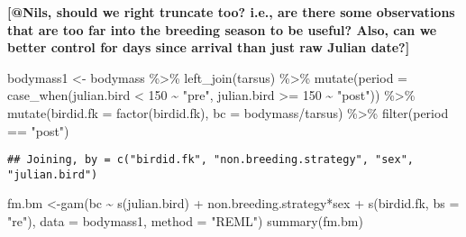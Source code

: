 \documentclass[
]{article}
\newenvironment{Shaded}{\begin{snugshade}}{\end{snugshade}}
\newcommand{\AttributeTok}[1]{\textcolor[rgb]{0.77,0.63,0.00}{#1}}
\newcommand{\DecValTok}[1]{\textcolor[rgb]{0.00,0.00,0.81}{#1}}
\newcommand{\FunctionTok}[1]{\textcolor[rgb]{0.00,0.00,0.00}{#1}}
\newcommand{\NormalTok}[1]{#1}
\newcommand{\OtherTok}[1]{\textcolor[rgb]{0.56,0.35,0.01}{#1}}
\newcommand{\SpecialCharTok}[1]{\textcolor[rgb]{0.00,0.00,0.00}{#1}}
\newcommand{\StringTok}[1]{\textcolor[rgb]{0.31,0.60,0.02}{#1}}
\begin{document}
\textbf{{[}@Nils, should we right truncate too? i.e., are there some
observations that are too far into the breeding season to be useful?
Also, can we better control for days since arrival than just raw Julian
date?{]}}

\begin{Shaded}
\begin{Highlighting}[]
\NormalTok{bodymass1 }\OtherTok{\textless{}{-}}\NormalTok{ bodymass }\SpecialCharTok{\%\textgreater{}\%} 
  \FunctionTok{left\_join}\NormalTok{(tarsus) }\SpecialCharTok{\%\textgreater{}\%} 
  \FunctionTok{mutate}\NormalTok{(}\AttributeTok{period =} \FunctionTok{case\_when}\NormalTok{(julian.bird }\SpecialCharTok{\textless{}} \DecValTok{150} \SpecialCharTok{\textasciitilde{}} \StringTok{"pre"}\NormalTok{,}
\NormalTok{                   julian.bird }\SpecialCharTok{\textgreater{}=} \DecValTok{150} \SpecialCharTok{\textasciitilde{}} \StringTok{"post"}\NormalTok{)) }\SpecialCharTok{\%\textgreater{}\%} 
  \FunctionTok{mutate}\NormalTok{(}\AttributeTok{birdid.fk =} \FunctionTok{factor}\NormalTok{(birdid.fk),}
         \AttributeTok{bc =}\NormalTok{ bodymass}\SpecialCharTok{/}\NormalTok{tarsus) }\SpecialCharTok{\%\textgreater{}\%} 
  \FunctionTok{filter}\NormalTok{(period }\SpecialCharTok{==} \StringTok{"post"}\NormalTok{)}
\end{Highlighting}
\end{Shaded}

\begin{verbatim}
## Joining, by = c("birdid.fk", "non.breeding.strategy", "sex", "julian.bird")
\end{verbatim}

\begin{Shaded}
\begin{Highlighting}[]
\NormalTok{fm.bm }\OtherTok{\textless{}{-}}\FunctionTok{gam}\NormalTok{(bc }\SpecialCharTok{\textasciitilde{}} \FunctionTok{s}\NormalTok{(julian.bird) }\SpecialCharTok{+}\NormalTok{ non.breeding.strategy}\SpecialCharTok{*}\NormalTok{sex }\SpecialCharTok{+} \FunctionTok{s}\NormalTok{(birdid.fk, }\AttributeTok{bs =} \StringTok{"re"}\NormalTok{), }\AttributeTok{data =}\NormalTok{ bodymass1, }\AttributeTok{method =} \StringTok{"REML"}\NormalTok{)}
\FunctionTok{summary}\NormalTok{(fm.bm)}
\end{Highlighting}
\end{Shaded}
\end{document}
